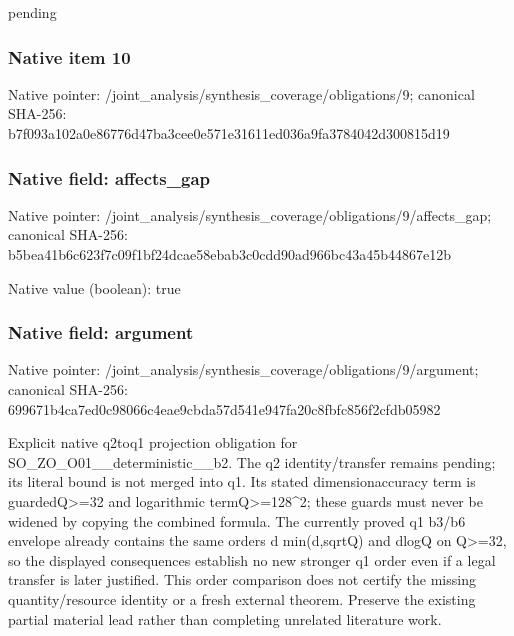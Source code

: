\documentclass[10pt,a4paper]{article}
\begin{document}
pending


\subsubsection{Native item 10}


Native pointer: /joint\_analysis/synthesi\allowbreak{}s\_coverage/obligations/9; canonical SHA-256: b7f093a102a0e86776d47ba3\allowbreak{}cee0e571e31611ed036a9fa3\allowbreak{}784042d300815d19



\subsubsection{Native field: affects\_gap}


Native pointer: /joint\_analysis/synthesi\allowbreak{}s\_coverage/obligations/9\allowbreak{}/affects\_gap; canonical SHA-256: b5bea41b6c623f7c09f1bf24\allowbreak{}dcae58ebab3c0cdd90ad966b\allowbreak{}c43a45b44867e12b



Native value (boolean): true



\subsubsection{Native field: argument}


Native pointer: /joint\_analysis/synthesi\allowbreak{}s\_coverage/obligations/9\allowbreak{}/argument; canonical SHA-256: 699671b4ca7ed0c98066c4ea\allowbreak{}e9cbda57d541e947fa20c8fb\allowbreak{}fc856f2cfdb05982


Explicit native q2toq1 projection obligation for SO\_ZO\_O01\_\_deterministic\_\_b2. The q2 identity/transfer remains pending; its literal bound is not merged into q1. Its stated dimensionaccuracy term is guardedQ>=32 and logarithmic termQ>=128\textasciicircum{}2; these guards must never be widened by copying the combined formula. The currently proved q1 b3/b6 envelope already contains the same orders d min(d,sqrtQ) and dlogQ on Q>=32, so the displayed consequences establish no new stronger q1 order even if a legal transfer is later justified. This order comparison does not certify the missing quantity/resource identity or a fresh external theorem. Preserve the existing partial material lead rather than completing unrelated literature work.
\end{document}

